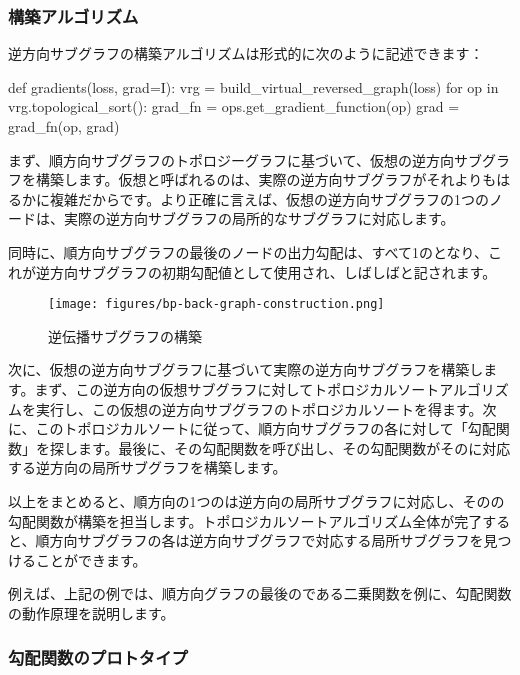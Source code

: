 \begin{content}
\subsubsection{構築アルゴリズム}

逆方向サブグラフの構築アルゴリズムは形式的に次のように記述できます：

\begin{leftbar}
\begin{python}
def gradients(loss, grad=I):
  vrg = build_virtual_reversed_graph(loss)
  for op in vrg.topological_sort():
    grad_fn = ops.get_gradient_function(op)
    grad = grad_fn(op, grad)
\end{python}
\end{leftbar}

まず、順方向サブグラフのトポロジーグラフに基づいて、仮想の逆方向サブグラフを構築します。仮想と呼ばれるのは、実際の逆方向サブグラフがそれよりもはるかに複雑だからです。より正確に言えば、仮想の逆方向サブグラフの1つのノードは、実際の逆方向サブグラフの局所的なサブグラフに対応します。

同時に、順方向サブグラフの最後のノードの出力勾配は、すべて1のとなり、これが逆方向サブグラフの初期勾配値として使用され、しばしばと記されます。

\begin{figure}[!htbp]
\centering
\texttt{[image: figures/bp-back-graph-construction.png]}
\caption{逆伝播サブグラフの構築}
 \label{fig:bp-back-graph-construction}
\end{figure}

次に、仮想の逆方向サブグラフに基づいて実際の逆方向サブグラフを構築します。まず、この逆方向の仮想サブグラフに対してトポロジカルソートアルゴリズムを実行し、この仮想の逆方向サブグラフのトポロジカルソートを得ます。次に、このトポロジカルソートに従って、順方向サブグラフの各に対して「勾配関数」を探します。最後に、その勾配関数を呼び出し、その勾配関数がそのに対応する逆方向の局所サブグラフを構築します。

以上をまとめると、順方向の1つのは逆方向の局所サブグラフに対応し、そのの勾配関数が構築を担当します。トポロジカルソートアルゴリズム全体が完了すると、順方向サブグラフの各は逆方向サブグラフで対応する局所サブグラフを見つけることができます。

例えば、上記の例では、順方向グラフの最後のである二乗関数を例に、勾配関数の動作原理を説明します。

\subsubsection{勾配関数のプロトタイプ}


\end{content}
